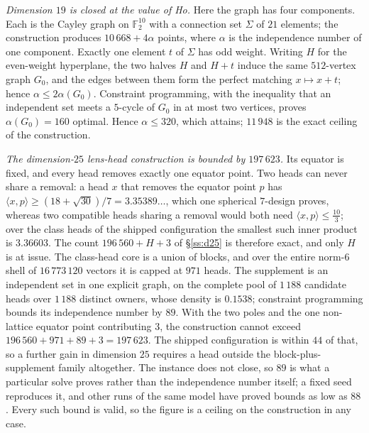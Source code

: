 \documentclass[11pt]{amsart}
\theoremstyle{remark}
\newcommand{\ip}[2]{\langle #1,#2\rangle}
\begin{document}
\emph{Dimension $19$ is closed at the value of Ho.} Here the graph has four
components. Each is the Cayley graph on $\mathbb F_2^{10}$ with a connection set
$\Sigma$ of $21$ elements; the construction produces $10\,668+4\alpha$
points, where $\alpha$ is the independence number of one component. Exactly one
element $t$ of $\Sigma$ has odd weight. Writing $H$ for the even-weight
hyperplane, the two halves $H$ and $H+t$ induce the same
$512$-vertex graph $G_0$, and the edges between them form the perfect matching
$x\mapsto x+t$; hence $\alpha\le2\alpha(G_0)$. Constraint programming, with the
inequality that an independent set meets a $5$-cycle of $G_0$ in at most two
vertices, proves $\alpha(G_0)=160$ optimal. Hence $\alpha\le320$, which
\cite{ho2026} attains; $11\,948$ is the exact ceiling of the construction.

\emph{The dimension-$25$ lens-head construction is bounded by $197\,623$.}
Its equator is fixed, and every head removes exactly one equator point. Two
heads can never share a removal: a head $x$ that removes the equator point $p$
has $\ip{x}{p}\ge(18+\sqrt{30})/7=3.35389\ldots$, which one spherical $7$-design
proves, whereas two compatible heads sharing a removal would both need
$\ip{x}{p}\le\tfrac{10}{3}$; over the class heads of the shipped configuration
the smallest such inner product is $3.36603$. The count $196\,560+H+3$ of \S\ref{ss:d25} is
therefore exact, and only $H$ is at issue. The
class-head core is a union of blocks, and over the entire norm-$6$ shell of
$16\,773\,120$ vectors it is capped at $971$ heads. The supplement is an
independent set in one explicit graph, on the complete pool of $1\,188$
candidate heads over $1\,188$ distinct owners, whose density is $0.1538$;
constraint programming bounds its independence number by $89$. With the two
poles and the one non-lattice equator point contributing $3$, the construction
cannot exceed $196\,560+971+89+3=197\,623$. The shipped configuration is within
$44$ of that, so a further gain in dimension $25$ requires a head outside the
block-plus-supplement family altogether. The instance does not close, so $89$ is
what a particular solve proves rather than the independence number itself; a fixed
seed reproduces it, and other runs of the same model have proved bounds as low as
$88$. Every such bound is valid, so the figure is a ceiling on the construction in
any case.
\end{document}
